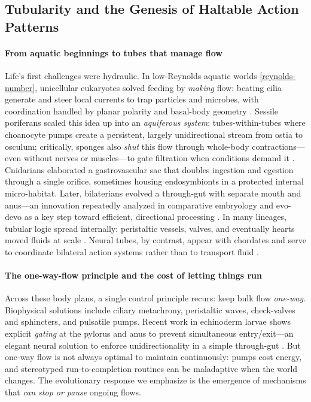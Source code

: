 
\subsection{Tubularity and the Genesis of Haltable Action Patterns}
\label{subsec:tubular}

\paragraph{From aquatic beginnings to tubes that manage flow}
Life’s first challenges were hydraulic. In low-Reynolds aquatic worlds \ref{reynolds-number}, unicellular eukaryotes solved feeding by \emph{making} flow: beating cilia generate and steer local currents to trap particles and microbes, with coordination handled by planar polarity and basal-body geometry \citep{Brooks2014Multiciliated,Shekhar2023CooperativeHydrodynamics}. Sessile poriferans scaled this idea up into an \emph{aquiferous system}: tubes-within-tubes where choanocyte pumps create a persistent, largely unidirectional stream from ostia to osculum; critically, sponges also \emph{shut} this flow through whole-body contractions—even without nerves or muscles—to gate filtration when conditions demand it \citep{Goldstein2020SpongeContractions,Morganti2019SpongePumping}. Cnidarians elaborated a gastrovascular sac that doubles ingestion and egestion through a single orifice, sometimes housing endosymbionts in a protected internal micro-habitat. Later, bilaterians evolved a through-gut with separate mouth and anus—an innovation repeatedly analyzed in comparative embryology and evo-devo as a key step toward efficient, directional processing \citep{Hejnol2015AnalEvolution,Nielsen2018MouthAnus,Presnell2016ThroughGut}. In many lineages, tubular logic spread internally: peristaltic vessels, valves, and eventually hearts moved fluids at scale \citep{MonahanEarley2013BVS}. Neural tubes, by contrast, appear with chordates and serve to coordinate bilateral action systems rather than to transport fluid \citep{Holland2015ChordateNervous}. 

\paragraph{The one-way-flow principle and the cost of letting things run}
Across these body plans, a single control principle recurs: keep bulk flow \emph{one-way}. Biophysical solutions include ciliary metachrony, peristaltic waves, check-valves and sphincters, and pulsatile pumps. Recent work in echinoderm larvae shows explicit \emph{gating} at the pylorus and anus to prevent simultaneous entry/exit—an elegant neural solution to enforce unidirectionality in a simple through-gut \citep{Yaguchi2024Sphincter}. But one-way flow is not always optimal to maintain continuously: pumps cost energy, and stereotyped run-to-completion routines can be maladaptive when the world changes. The evolutionary response we emphasize is the emergence of mechanisms that \emph{can stop or pause} ongoing flows. 

